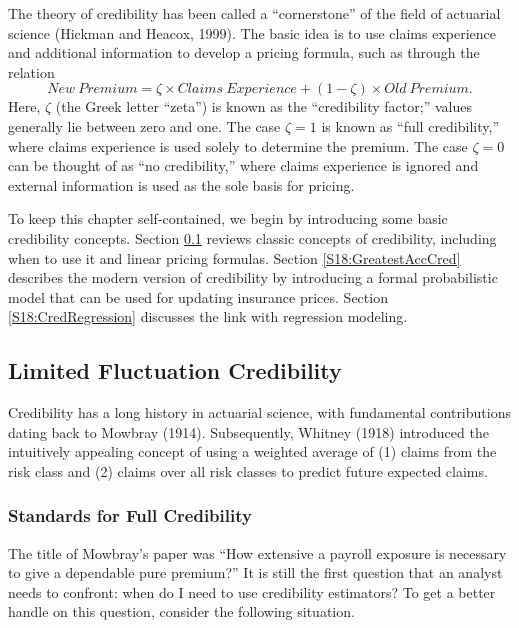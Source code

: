 The theory of credibility has been called a ``cornerstone'' of the
field of actuarial science (Hickman and Heacox, 1999). The basic
idea is to use claims experience and additional information to
develop a pricing formula, such as through the relation
\begin{equation}\label{E18:Cred}
New~Premium =  \zeta \times Claims~Experience + (1 - \zeta)  \times
Old~Premium.
\end{equation}
Here, $\zeta$ (the Greek letter ``zeta'') is known as the
``credibility factor;'' values generally lie between zero and one.
The case $\zeta=1$ is known as ``full credibility,'' where claims
experience is used solely to determine the premium. The case
$\zeta=0$  can be thought of as ``no credibility,'' where claims
experience is ignored and external information is used as the sole
basis for pricing.

To keep this chapter self-contained, we begin by introducing some
basic credibility concepts. Section \ref{S18:LimFCred} reviews
classic concepts of credibility, including when to use it and linear
pricing formulas. Section \ref{S18:GreatestAccCred} describes the
modern version of credibility by introducing a formal probabilistic
model that can be used for updating insurance prices. Section
\ref{S18:CredRegression} discusses the link with regression
modeling.


\subsection{Limited Fluctuation Credibility}\label{S18:LimFCred}

Credibility has a long history in actuarial science, with
fundamental contributions dating back to Mowbray (1914).
Subsequently, Whitney (1918) introduced the intuitively appealing
concept of using a weighted average of (1) claims from the risk
class and (2) claims over all risk classes to predict future
expected claims.


\subsubsection*{Standards for Full Credibility}

The title of Mowbray's paper was ``How extensive a payroll exposure
is necessary to give a dependable pure premium?'' It is still the
first question that an analyst needs to confront: when do I need to
use credibility estimators? To get a better handle on this question,
consider the following situation.

